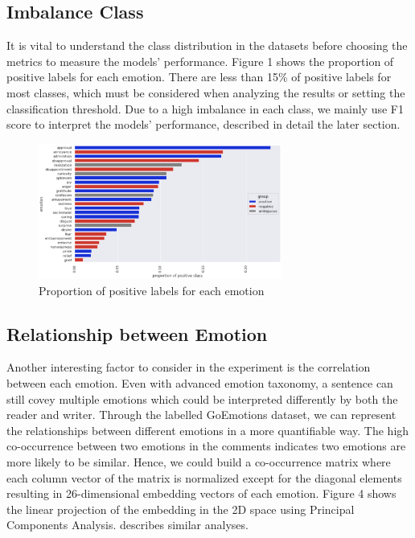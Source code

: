 \documentclass[conference]{IEEEtran}
\begin{document}
\subsection{Imbalance Class}
It is vital to understand the class distribution in the datasets before choosing the metrics to measure the models' performance. Figure 1 shows the proportion of positive labels for each emotion. There are less than 15\% of positive labels for most classes, which must be considered when analyzing the results or setting the classification threshold. Due to a high imbalance in each class, we mainly use F1 score to interpret the models' performance, described in detail the later section.

\begin{figure}[htbp]
\centerline{\includegraphics[width=8cm, keepaspectratio]{fig/fine-grained-emotion-proportion-positive.png}}
\caption{Proportion of positive labels for each emotion}
\label{fig}
\end{figure}


\subsection{Relationship between Emotion}
Another interesting factor to consider in the experiment is the correlation between each emotion. Even with advanced emotion taxonomy, a sentence can still covey multiple emotions which could be interpreted differently by both the reader and writer. Through the labelled GoEmotions dataset, we can represent the relationships between different emotions in a more quantifiable way. The high co-occurrence between two emotions in the comments indicates two emotions are more likely to be similar. Hence, we could build a co-occurrence matrix where each column vector of the matrix is normalized except for the diagonal elements resulting in 26-dimensional embedding vectors of each emotion. Figure 4 shows the linear projection of the embedding in the 2D space using Principal Components Analysis. \cite{DBLP:journals/corr/abs-2005-00547} describes similar analyses. 
\end{document}
